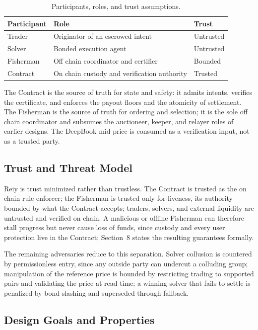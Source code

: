 \documentclass[10pt,sigconf,nonacm]{acmart}
\theoremstyle{reiythm}
\begin{document}
\begin{table}[htbp]
  \centering
  \caption{Participants, roles, and trust assumptions.}
  \label{tab:actors}
  \begin{tabular}{@{}lp{3.6cm}l@{}}
    \toprule
    Participant & Role & Trust \\
    \midrule
    Trader & Originator of an escrowed intent & Untrusted \\
    Solver & Bonded execution agent & Untrusted \\
    Fisherman & Off chain coordinator and certifier & Bounded \\
    Contract & On chain custody and verification authority & Trusted \\
    \bottomrule
  \end{tabular}
\end{table}

The Contract is the source of truth for state and safety: it admits intents,
verifies the certificate, and enforces the payout floors and the atomicity of
settlement. The Fisherman is the source of truth for ordering and selection; it
is the sole off chain coordinator and subsumes the auctioneer, keeper, and relayer
roles of earlier designs. The DeepBook mid price is consumed as a verification
input, not as a trusted party.

\subsection{Trust and Threat Model}

Reiy is trust minimized rather than trustless. The Contract is trusted as the
on chain rule enforcer; the Fisherman is trusted only for liveness, its authority
bounded by what the Contract accepts; traders, solvers, and external liquidity are
untrusted and verified on chain. A malicious or offline Fisherman can therefore
stall progress but never cause loss of funds, since custody and every user
protection live in the Contract; Section~8 states the resulting guarantees
formally.

The remaining adversaries reduce to this separation. Solver collusion is countered
by permissionless entry, since any outside party can undercut a colluding group;
manipulation of the reference price is bounded by restricting trading to supported
pairs and validating the price at read time; a winning solver that fails to settle
is penalized by bond slashing and superseded through fallback.

\subsection{Design Goals and Properties}
\end{document}
